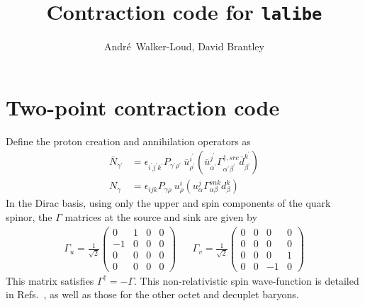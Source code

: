\documentclass[prd,12pt,superscriptaddress,tightenlines,nofootinbib]{revtex4}
\def\a{{\alpha}}
\def\b{{\beta}}
\def\g{{\gamma}}
\def\G{{\Gamma}}
\def\ip{{i^\prime}}
\def\jp{{j^\prime}}
\def\kp{{k^\prime}}
\def\ap{{\alpha^\prime}}
\def\bp{{\beta^\prime}}
\def\gp{{\gamma^\prime}}
\def\rp{{\rho^\prime}}
\begin{document}
\title{Contraction code for \texttt{lalibe}}

\author{Andr\'{e}~Walker-Loud, David Brantley}


\maketitle

\section{Two-point contraction code}

Define the proton creation and annihilation operators as
\begin{align}
\bar{N}_{\gp} &= \epsilon_{\ip\jp\kp} P_{\gp\rp}\ \bar{u}^\ip_\rp (\bar{u}^{\jp}_{\ap} \G^{\dagger,src}_{\ap\bp} \bar{d}^\kp_\bp )
\\
N_{\g} &= \epsilon_{ijk} P_{\g\rho}\ u^i_\rho (u^j_\a \G^{snk}_{\a\b} d^k_\b )
\end{align}
In the Dirac basis, using only the upper and spin components of the quark spinor, the $\G$ matrices at the source and sink are given by
\begin{align}
\G_{u} = \frac{1}{\sqrt{2}}\begin{pmatrix}
	0& 1& 0& 0\\
	-1& 0& 0& 0\\
	0& 0& 0& 0\\
	0& 0& 0& 0
	\end{pmatrix} && \G_{v} =  \frac{1}{\sqrt{2}}\begin{pmatrix}
	0& 0& 0& 0\\
	0& 0& 0& 0\\
	0& 0& 0& 1\\
	0& 0& -1& 0
	\end{pmatrix}
\end{align}
This matrix satisfies $\G^\dagger = -\G$.
This non-relativistic spin wave-function is detailed in Refs.~\cite{Basak:2005aq,Basak:2005ir}, as well as those for the other octet and decuplet baryons.
\end{document}

